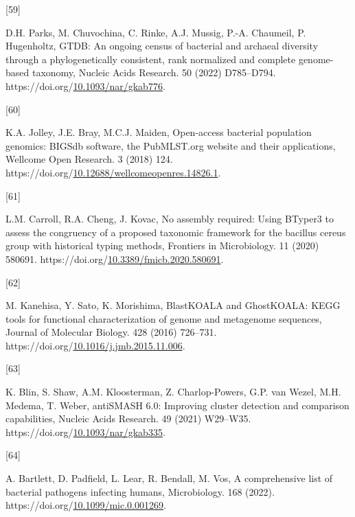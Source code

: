\documentclass[preprint,3p,
a4paper]{elsarticle} %
\newlength{\cslhangindent}
\newlength{\csllabelwidth}
\newlength{\cslentryspacingunit} %
\newenvironment{CSLReferences}[2] %
 {%
  \setlength{\parindent}{0pt}
  \ifodd #1
  \let\oldpar\par
  \def\par{\hangindent=\cslhangindent\oldpar}
  \fi
  \setlength{\parskip}{#2\cslentryspacingunit}
 }%
 {}
\newcommand{\CSLLeftMargin}[1]{\parbox[t]{\csllabelwidth}{#1}}
\newcommand{\CSLRightInline}[1]{\parbox[t]{\linewidth - \csllabelwidth}{#1}\break}
\begin{document}
\begin{CSLReferences}{0}{0}
\leavevmode{}%
\CSLLeftMargin{{[}59{]} }%
\CSLRightInline{D.H. Parks, M. Chuvochina, C. Rinke, A.J. Mussig, P.-A.
Chaumeil, P. Hugenholtz, GTDB: An ongoing census of bacterial and
archaeal diversity through a phylogenetically consistent, rank
normalized and complete genome-based taxonomy, Nucleic Acids Research.
50 (2022) D785--D794.
https://doi.org/\href{https://doi.org/10.1093/nar/gkab776}{10.1093/nar/gkab776}.}

\leavevmode{}%
\CSLLeftMargin{{[}60{]} }%
\CSLRightInline{K.A. Jolley, J.E. Bray, M.C.J. Maiden, Open-access
bacterial population genomics: BIGSdb software, the PubMLST.org website
and their applications, Wellcome Open Research. 3 (2018) 124.
https://doi.org/\href{https://doi.org/10.12688/wellcomeopenres.14826.1}{10.12688/wellcomeopenres.14826.1}.}

\leavevmode{}%
\CSLLeftMargin{{[}61{]} }%
\CSLRightInline{L.M. Carroll, R.A. Cheng, J. Kovac, No assembly
required: Using BTyper3 to assess the congruency of a proposed taxonomic
framework for the bacillus cereus group with historical typing methods,
Frontiers in Microbiology. 11 (2020) 580691.
https://doi.org/\href{https://doi.org/10.3389/fmicb.2020.580691}{10.3389/fmicb.2020.580691}.}

\leavevmode{}%
\CSLLeftMargin{{[}62{]} }%
\CSLRightInline{M. Kanehisa, Y. Sato, K. Morishima, BlastKOALA and
GhostKOALA: KEGG tools for functional characterization of genome and
metagenome sequences, Journal of Molecular Biology. 428 (2016) 726--731.
https://doi.org/\href{https://doi.org/10.1016/j.jmb.2015.11.006}{10.1016/j.jmb.2015.11.006}.}

\leavevmode{}%
\CSLLeftMargin{{[}63{]} }%
\CSLRightInline{K. Blin, S. Shaw, A.M. Kloosterman, Z. Charlop-Powers,
G.P. van Wezel, M.H. Medema, T. Weber, antiSMASH 6.0: Improving cluster
detection and comparison capabilities, Nucleic Acids Research. 49 (2021)
W29--W35.
https://doi.org/\href{https://doi.org/10.1093/nar/gkab335}{10.1093/nar/gkab335}.}

\leavevmode{}%
\CSLLeftMargin{{[}64{]} }%
\CSLRightInline{A. Bartlett, D. Padfield, L. Lear, R. Bendall, M. Vos, A
comprehensive list of bacterial pathogens infecting humans,
Microbiology. 168 (2022).
https://doi.org/\href{https://doi.org/10.1099/mic.0.001269}{10.1099/mic.0.001269}.}


\end{CSLReferences}
\end{document}
